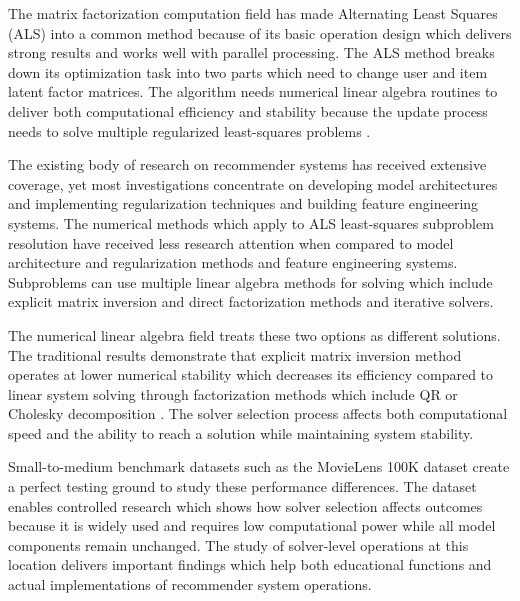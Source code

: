 \documentclass[12pt,a4paper]{report}
\begin{document}
The matrix factorization computation field has made Alternating Least Squares (ALS) into a common method because of its basic operation design which delivers strong results and works well with parallel processing. The ALS method breaks down its optimization task into two parts which need to change user and item latent factor matrices. The algorithm needs numerical linear algebra routines to deliver both computational efficiency and stability because the update process needs to solve multiple regularized least-squares problems \parencite{zhou2008large}.


The existing body of research on recommender systems has received extensive coverage, yet most investigations concentrate on developing model architectures and implementing regularization techniques and building feature engineering systems. The numerical methods which apply to ALS least-squares subproblem resolution have received less research attention when compared to model architecture and regularization methods and feature engineering systems. Subproblems can use multiple linear algebra methods for solving which include explicit matrix inversion and direct factorization methods and iterative solvers.

The numerical linear algebra field treats these two options as different solutions. The traditional results demonstrate that explicit matrix inversion method operates at lower numerical stability which decreases its efficiency compared to linear system solving through factorization methods which include QR or Cholesky decomposition \parencite{trefethen1997numerical, golub2013matrix}. The solver selection process affects both computational speed and the ability to reach a solution while maintaining system stability.

Small-to-medium benchmark datasets such as the MovieLens 100K dataset create a perfect testing ground to study these performance differences. The dataset enables controlled research which shows how solver selection affects outcomes because it is widely used and requires low computational power while all model components remain unchanged. The study of solver-level operations at this location delivers important findings which help both educational functions and actual implementations of recommender system operations.
\end{document}
